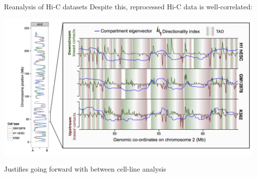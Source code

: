 \documentclass{beamer}
\begin{document}
\begin{frame}{Reanalysis of Hi-C datasets}
Despite this, reprocessed Hi-C data is well-correlated: \\

\vspace{2em}

{\centering
\includegraphics[width=.9\textwidth]{../figs/blowout.png}
}
\vspace{2em}

Justifies going forward with between cell-line analysis

\end{frame}
\end{document}
